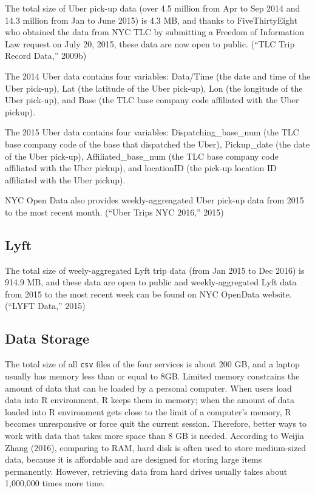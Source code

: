 \documentclass[12pt,twoside]{reedthesis}
\theoremstyle{definition}
\theoremstyle{definition}
\theoremstyle{definition}
\theoremstyle{remark}
\begin{document}
The total size of Uber pick-up data (over 4.5 million from Apr to Sep
2014 and 14.3 million from Jan to June 2015) is 4.3 MB, and thanks to
FiveThirtyEight who obtained the data from NYC TLC by submitting a
Freedom of Information Law request on July 20, 2015, these data are now
open to public. (``TLC Trip Record Data,'' 2009b)

The 2014 Uber data contains four variables: Data/Time (the date and time
of the Uber pick-up), Lat (the latitude of the Uber pick-up), Lon (the
longitude of the Uber pick-up), and Base (the TLC base company code
affiliated with the Uber pickup).

The 2015 Uber data contains four variables: Dispatching\_base\_num (the
TLC base company code of the base that dispatched the Uber),
Pickup\_date (the date of the Uber pick-up), Affiliated\_base\_num (the
TLC base company code affiliated with the Uber pickup), and locationID
(the pick-up location ID affiliated with the Uber pickup).

NYC Open Data also provides weekly-aggreagated Uber pick-up data from
2015 to the most recent month. (``Uber Trips NYC 2016,'' 2015)

\subsection{Lyft}\label{lyft-1}

The total size of weely-aggregated Lyft trip data (from Jan 2015 to Dec
2016) is 914.9 MB, and these data are open to public and
weekly-aggregated Lyft data from 2015 to the most recent week can be
found on NYC OpenData website. (``LYFT Data,'' 2015)

\subsection{Data Storage}\label{data-storage}

The total size of all \texttt{csv} files of the four services is about
200 GB, and a laptop usually has memory less than or equal to 8GB.
Limited memory constrains the amount of data that can be loaded by a
personal computer. When users load data into R environment, R keeps them
in memory; when the amount of data loaded into R environment gets close
to the limit of a computer's memory, R becomes unresponsive or force
quit the current session. Therefore, better ways to work with data that
takes more space than 8 GB is needed. According to Weijia Zhang (2016),
comparing to RAM, hard disk is often used to store medium-sized data,
because it is affordable and are designed for storing large items
permanently. However, retrieving data from hard drives usually takes
about 1,000,000 times more time.
\end{document}
